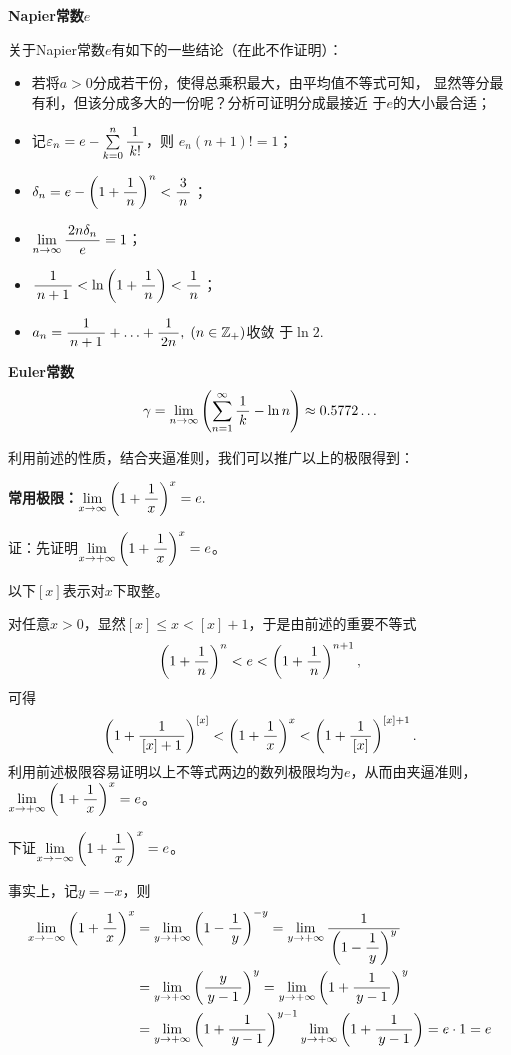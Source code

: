 \begin{shaded}
	{\bf Napier常数$e$}

	关于Napier常数$e$有如下的一些结论（在此不作证明）：	
	\begin{itemize}
		\setlength{\itemindent}{1cm}
		\item 若将$a>0$分成若干份，使得总乘积最大，由平均值不等式可知，
		显然等分最有利，但该分成多大的一份呢？分析可证明分成最接近
		于$e$的大小最合适；
		\item 记$\e_n=e-\sum\limits_{k=0}^n\df1{k!}$，则
		\limn $e_n(n+1)!=1$；
		\item $\delta_n=e-\left(1+\df1n\right)^n<\df3n$；
		\item $\limn\df{2n\delta_n}e=1$；
		\item $\df1{n+1}<\ln\left(1+\df1n\right)<\df1n$；
		\item $a_n=\df1{n+1}+\ldots+\df1{2n},\;(n\in\mathbb{Z}_+)$收敛
		于$\ln2$.
	\end{itemize}
	
	\bs
	{\bf Euler常数}
	$$\gamma=\limn\left(\sumn\df1k-\ln n\right)\approx 0.5772\ldots$$
\end{shaded}

利用前述的性质，结合夹逼准则，我们可以推广以上的极限得到：
\begin{thx}
	{\bf 常用极限：}$\limx{\infty}\left(1+\df1x\right)^x=e.$
\end{thx}

证：先证明$\limx{+\infty}\left(1+\df1x\right)^x=e$。

以下$[x]$表示对$x$下取整。

对任意$x>0$，显然$[x]\leq x<[x]+1$，于是由前述的重要不等式
$$\left(1+\df1n\right)^n<e<\left(1+\df1n\right)^{n+1},$$
可得
$$\left(1+\df1{[x]+1}\right)^{[x]}<\left(1+\df1x\right)^x
<\left(1+\df1{[x]}\right)^{[x]+1}.$$
利用前述极限容易证明以上不等式两边的数列极限均为$e$，从而由夹逼准则，
$\limx{+\infty}\left(1+\df1x\right)^x=e$。

下证$\limx{-\infty}\left(1+\df1x\right)^x=e$。

事实上，记$y=-x$，则
\begin{align*}
	\limx{-\infty}\left(1+\df1x\right)^x
	&=\lim\limits_{y\to+\infty}\left(1-\df1y\right)^{-y}
	=\lim\limits_{y\to+\infty}\df1{\left(1-\df1y\right)^{y}}\\
	&=\lim\limits_{y\to+\infty}\left(\df y{y-1}\right)^{y}
	=\lim\limits_{y\to+\infty}\left(1+\df1{y-1}\right)^{y}\\
	&=\lim\limits_{y\to+\infty}\left(1+\df1{y-1}\right)^{y-1}
	\lim\limits_{y\to+\infty}\left(1+\df1{y-1}\right)=e\cdot1=e
\end{align*}
\fin

